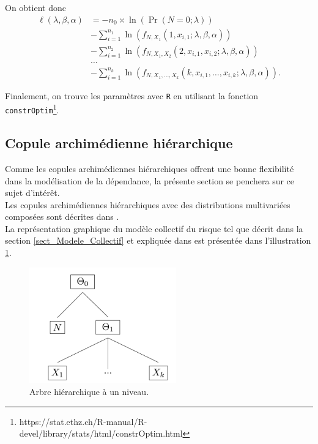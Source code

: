 \documentclass{article}
\begin{document}
		On obtient donc
		\begin{align}
		\ell(\lambda, \beta, \alpha) 
		&=  - n_0 \times \ln \left( \Pr (N=0 ; \lambda) \right) \nonumber\\
		& - \sum_{i=1}^{n_1} \ln \left(f_{N,X_1}(1,x_{i,1};\lambda,\beta, \alpha) \right) \nonumber \\
		& - \sum_{i=1}^{n_2} \ln \left(f_{N,X_1,X_2}(2,x_{i,1},x_{i,2};\lambda,\beta, \alpha)\right) \label{logLikelyhood_neg} \\
		& \dots \nonumber\\
		& - \sum_{i=1}^{n_k} \ln \left( f_{N,X_1,\dots,X_k}(k,x_{i,1},\dots,x_{i,k};\lambda,\beta, \alpha)\right). \nonumber
		\end{align}
		
		Finalement, on trouve les paramètres avec \texttt{R} en utilisant la fonction \texttt{constrOptim}\footnote{https://stat.ethz.ch/R-manual/R-devel/library/stats/html/constrOptim.html}.
		

	\subsection{Copule archimédienne hiérarchique}	
	Comme les copules archimédiennes hiérarchiques offrent une bonne flexibilité dans la modélisation de la dépendance, la présente section se penchera sur ce sujet d'intérêt.\\
	
	Les copules archimédiennes hiérarchiques avec des distributions multivariées composées sont décrites dans \cite{Itre4}.\\
	La représentation graphique du modèle collectif du risque tel que décrit dans la section \ref{sect_Modele_Collectif} et expliquée dans \cite{Itre5} est présentée dans l'illustration \ref{graph_hierarchie}.
	
	\begin{figure}[H]
		\centering
		\includegraphics[height=5cm]{Hierarchie}
		\renewcommand{\figurename}{Illustration}
		\caption{Arbre hiérarchique à un niveau.} \label{graph_hierarchie}
	\end{figure}
\end{document}
